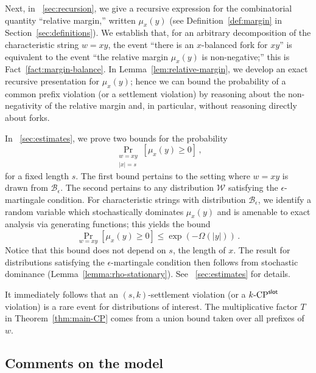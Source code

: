 Next, in \Section~\ref{sec:recursion}, 
we give a recursive expression for the combinatorial quantity 
``relative margin,'' written
$\mu_x(y)$ (see Definition~\ref{def:margin} in Section~\ref{sec:definitions}). 
We establish that,
for an arbitrary decomposition of the characteristic string $w = xy$, 
the event ``there is an $x$-balanced fork for $xy$'' 
is equivalent to the event 
``the relative margin $\mu_x(y)$ is non-negative;'' 
this is Fact~\ref{fact:margin-balance}. 
In Lemma~\ref{lem:relative-margin}, we develop an exact recursive presentation for $\mu_x(y)$; hence we can bound the probability of a common prefix violation
(or a settlement violation) 
by reasoning about the non-negativity of the relative margin 
and, in particular, without reasoning directly about forks. 

In \Section~\ref{sec:estimates}, we prove two bounds for the probability 
\[
  \Pr_{\substack{w = xy\\|x| = s}}[\mu_x(y) \geq 0]\,,
\]
for a fixed length $s$.  The first bound pertains to the setting where
$w = xy$ is drawn from $\mathcal{B}_\epsilon$. The second pertains to
any distribution $\mathcal{W}$ satisfying the $\epsilon$-martingale
condition.  For characteristic strings with distribution
$\mathcal{B}_\epsilon$, we identify a random variable which
stochastically dominates $\mu_x(y)$ and is amenable to exact analysis
via generating functions; this yields the bound
\[
  \Pr_{w=xy}[\mu_x(y) \geq 0] \leq \exp(-\Omega(|y|))
  \,.
\]
Notice that this bound does not depend on $s$, the length of $x$.  The
result for distributions satisfying the $\epsilon$-martingale
condition then follows from stochastic dominance
(Lemma~\ref{lemma:rho-stationary}).  See \Section~\ref{sec:estimates}
for details.

It immediately follows that 
an $(s,k)$-settlement violation (or a ${k}\text{-}\mathrm{CP}^{\mathsf{slot}}$ violation) is a rare event 
for distributions of interest. 
The multiplicative factor $T$ in Theorem~\ref{thm:main-CP} comes from a union bound 
taken over all prefixes of $w$.




\subsection{Comments on the model}
\label{sec:model-comments}

